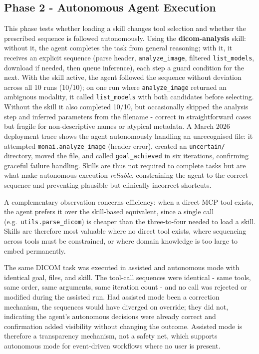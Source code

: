 \documentclass[preprint,12pt]{elsarticle}
\begin{document}
\subsection{Phase 2  -  Autonomous Agent Execution}
This phase tests whether loading a skill changes tool selection and whether the prescribed sequence is followed autonomously. Using the \textbf{dicom-analysis} skill: without it, the agent completes the task from general reasoning; with it, it receives an explicit sequence (parse header, \texttt{analyze\_image}, filtered \texttt{list\_models}, download if needed, then queue inference), each step a guard condition for the next. With the skill active, the agent followed the sequence without deviation across all 10 runs (10/10); on one run where \texttt{analyze\_image} returned an ambiguous modality, it called \texttt{list\_models} with both candidates before selecting. Without the skill it also completed 10/10, but occasionally skipped the analysis step and inferred parameters from the filename - correct in straightforward cases but fragile for non-descriptive names or atypical metadata. A March 2026 deployment trace shows the agent autonomously handling an unrecognised file: it attempted \texttt{monai.analyze\_image} (header error), created an \texttt{uncertain/} directory, moved the file, and called \texttt{goal\_achieved} in six iterations, confirming graceful failure handling. Skills are thus not required to complete tasks but are what make autonomous execution \emph{reliable}, constraining the agent to the correct sequence and preventing plausible but clinically incorrect shortcuts.

A complementary observation concerns efficiency: when a direct MCP tool exists, the agent prefers it over the skill-based equivalent, since a single call (e.g.\ \texttt{utils.parse\_dicom}) is cheaper than the three-to-four needed to load a skill. Skills are therefore most valuable where no direct tool exists, where sequencing across tools must be constrained, or where domain knowledge is too large to embed permanently.

The same DICOM task was executed in assisted and autonomous mode with identical goal, files, and skill. The tool-call sequences were identical - same tools, same order, same arguments, same iteration count - and no call was rejected or modified during the assisted run. Had assisted mode been a correction mechanism, the sequences would have diverged on override; they did not, indicating the agent's autonomous decisions were already correct and confirmation added visibility without changing the outcome. Assisted mode is therefore a transparency mechanism, not a safety net, which supports autonomous mode for event-driven workflows where no user is present.
\end{document}
